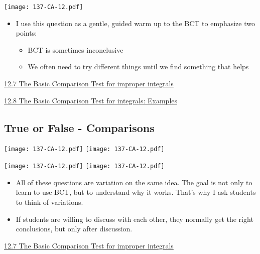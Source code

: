 \documentclass[11pt]{article}
\newcommand{\nl}{\hfill \vspace{-1.1\baselineskip}} %
\newcommand{\vvii}{\hspace{8mm} \href{https://www.youtube.com/watch?v=8xtCdrLzQpQ&list=PLlwePzQY_wW-OVbBuwbFDl8RB5kt2Tngo&index=7}{12.7 The Basic Comparison Test for improper integrals}}
\newcommand{\vviii}{\hspace{8mm} \href{https://www.youtube.com/watch?v=9NeR7QXGJbE&list=PLlwePzQY_wW-OVbBuwbFDl8RB5kt2Tngo&index=8}{12.8 The Basic Comparison Test for integrals: Examples}}
\begin{document}
\begin{center}
{ \texttt{[image: 137-CA-12.pdf]}} 
\end{center}

\begin{comments}
\nl
	\begin{itemize}
		\item  I use this question as a gentle, guided warm up to the BCT to emphasize two points:	
			\begin{itemize}
				\item BCT is sometimes inconclusive
				\item  We often need to try different things until we find something that helps
			\end{itemize}
	\end{itemize}
\end{comments}

\begin{videos}
\vvii

\vviii
\end{videos}

\newpage
\subsection{True or False - Comparisons}

\begin{center}
{ \texttt{[image: 137-CA-12.pdf]}} \quad
{ \texttt{[image: 137-CA-12.pdf]}} 

{ \texttt{[image: 137-CA-12.pdf]}} \quad
{ \texttt{[image: 137-CA-12.pdf]}} 
\end{center}

\begin{comments}
\nl
	\begin{itemize}
		\item All of these questions are variation on the same idea.  The goal is not only to learn to use BCT, but to understand why it works.  That's why I ask students to think of variations.
		\item If students are willing to discuss with each other, they normally get the right conclusions, but only after discussion.
	\end{itemize}
\end{comments}

\begin{videos}
\vvii
\end{videos}
\end{document}

